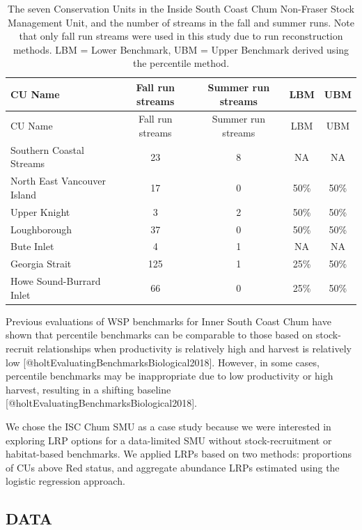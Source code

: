 \documentclass[
]{article}
\begin{document}
\needspace{0.35\textheight}

\begin{longtable}[]{@{}lcccc@{}}
\caption{The seven Conservation Units in the Inside South Coast Chum
Non-Fraser Stock Management Unit, and the number of streams in the fall
and summer runs. Note that only fall run streams were used in this study
due to run reconstruction methods. LBM = Lower Benchmark, UBM = Upper
Benchmark derived using the percentile method.}\tabularnewline
\toprule()
CU Name & Fall run streams & Summer run streams & LBM & UBM \\
\midrule()
\endfirsthead
\toprule()
CU Name & Fall run streams & Summer run streams & LBM & UBM \\
\midrule()
\endhead
Southern Coastal Streams & 23 & 8 & NA & NA \\
North East Vancouver Island & 17 & 0 & 50\% & 50\% \\
Upper Knight & 3 & 2 & 50\% & 50\% \\
Loughborough & 37 & 0 & 50\% & 50\% \\
Bute Inlet & 4 & 1 & NA & NA \\
Georgia Strait & 125 & 1 & 25\% & 50\% \\
Howe Sound-Burrard Inlet & 66 & 0 & 25\% & 50\% \\
\bottomrule()
\end{longtable}

\afterpage{\clearpage}

Previous evaluations of WSP benchmarks for Inner South Coast Chum have
shown that percentile benchmarks can be comparable to those based on
stock-recruit relationships when productivity is relatively high and
harvest is relatively low {[}@holtEvaluatingBenchmarksBiological2018{]}.
However, in some cases, percentile benchmarks may be inappropriate due
to low productivity or high harvest, resulting in a shifting baseline
{[}@holtEvaluatingBenchmarksBiological2018{]}.

We chose the ISC Chum SMU as a case study because we were interested in
exploring LRP options for a data-limited SMU without stock-recruitment
or habitat-based benchmarks. We applied LRPs based on two methods:
proportions of CUs above Red status, and aggregate abundance LRPs
estimated using the logistic regression approach.

\hypertarget{data}{%
\subsection{DATA}\label{data}}
\end{document}
